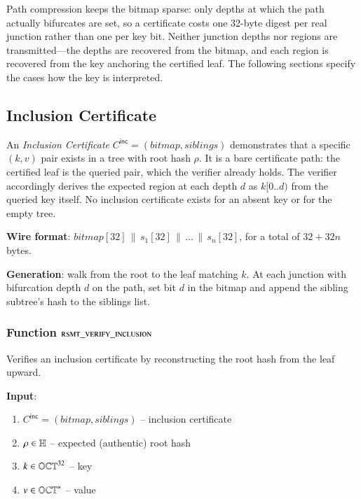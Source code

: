 Path compression keeps the bitmap sparse: only depths at which the path actually bifurcates are set, so a certificate costs one 32-byte digest per real junction rather than one per key bit. Neither junction depths nor regions are transmitted---the depths are recovered from the bitmap, and each region is recovered from the key anchoring the certified leaf. The following sections specify the cases how the key is interpreted.

\subsection{Inclusion Certificate}\label{sec:rsmt-inclusion-cert}

An \emph{Inclusion Certificate} $C^\mathsf{inc}=(\mathit{bitmap},\mathit{siblings})$ demonstrates that a specific $(k,v)$ pair exists in a tree with root hash $\rho$. It is a bare certificate path: the certified leaf is the queried pair, which the verifier already holds. The verifier accordingly derives the expected region at each depth $d$ as $k[0..d)$ from the queried key itself. No inclusion certificate exists for an absent key or for the empty tree.

\noindent\textbf{Wire format}: $\mathit{bitmap}[32] \,\|\, s_1[32] \,\|\, \ldots \,\|\, s_n[32]$, for a total of $32+32n$ bytes.

\noindent\textbf{Generation}: walk from the root to the leaf matching $k$. At each junction with bifurcation depth $d$ on the path, set bit $d$ in the bitmap and append the sibling subtree's hash to the siblings list.

\subsubsection{Function $\textsc{rsmt\_verify\_inclusion}$}\label{sec:rsmt-verify-inclusion}

Verifies an inclusion certificate by reconstructing the root hash from the leaf upward.

\textbf{Input}:
\begin{enumerate}
	\item $C^\mathsf{inc} = (\mathit{bitmap}, \mathit{siblings})$ -- inclusion certificate
	\item $\rho \in \mathbb{H}$ -- expected (authentic) root hash
	\item $k \in \mathbb{OCT}^{32}$ -- key
	\item $v \in \mathbb{OCT}^{\ast}$ -- value
\end{enumerate}

